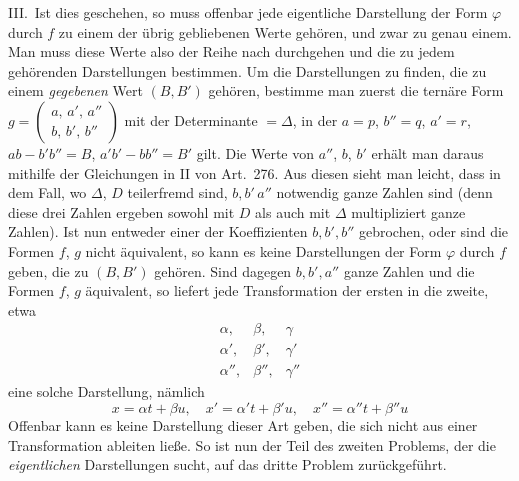 III.\ Ist dies geschehen, so muss offenbar jede eigentliche Darstellung
der Form $\varphi$ durch $f$ zu einem der übrig gebliebenen Werte gehören,
und zwar zu genau einem. Man muss diese Werte also der Reihe nach durchgehen
und die zu jedem gehörenden Darstellungen bestimmen. Um die Darstellungen
zu finden, die zu einem \textit{gegebenen} Wert $(B,B')$ gehören, bestimme
man zuerst die ternäre Form $g=\left(\begin{smallmatrix}a,\,a',\,a''\\b,\,b',\,b''\end{smallmatrix}\right)$ mit der Determinante $=\Delta$, in der
$a=p$, $b''=q$, $a'=r$, $ab-b'b''=B$, $a'b'-bb''=B'$ gilt. Die Werte von $a''$,
$b$, $b'$ erhält man daraus mithilfe der Gleichungen in II von
Art.\ 276. Aus diesen sieht man leicht, dass in dem Fall, wo $\Delta$,
$D$ teilerfremd sind, $b,b'\,a''$ notwendig ganze Zahlen sind (denn diese
drei Zahlen ergeben sowohl mit $D$ als auch mit $\Delta$ multipliziert
ganze Zahlen). Ist nun entweder einer der Koeffizienten $b,b',b''$ gebrochen,
oder sind die Formen $f$, $g$ nicht äquivalent, so kann es keine
Darstellungen der Form $\varphi$ durch $f$ geben, die zu $(B,B')$ gehören.
Sind dagegen $b,b',a''$ ganze Zahlen und die Formen $f$, $g$ äquivalent,
so liefert jede Transformation der ersten in die zweite, etwa
\[
\begin{array}{ccc}
\alpha,&\beta,&\gamma\\
\alpha',&\beta',&\gamma'\\
\alpha'',&\beta'',&\gamma''
\end{array}
\]
eine solche Darstellung, nämlich
\[
x=\alpha t+\beta u,\quad x'=\alpha't+\beta'u,\quad x''=\alpha''t+\beta''u
\]
Offenbar kann es keine Darstellung dieser Art geben, die sich nicht aus
einer Transformation ableiten ließe. So ist nun der Teil des zweiten Problems,
der die \textit{eigentlichen} Darstellungen sucht, auf das dritte Problem
zurückgeführt.


